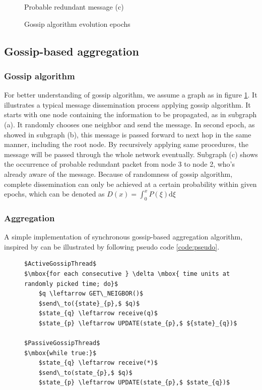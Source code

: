 \begin{figure}[h!]
\begin{center}
\begin{minipage}[c]{0.45\textwidth}
      Probable redundant message (c)
   	\end{minipage}
   \end{center}
   \caption{Gossip algorithm evolution epochs}
   \label{fig:epochs}
\end{figure}
\subsection{Gossip-based aggregation}

\subsubsection{Gossip algorithm}
For better understanding of gossip algorithm, we assume a graph as in figure \ref{fig:epochs}. It illustrates a typical message dissemination process applying gossip algorithm. It starts with one node containing the information to be propagated, as in subgraph (a). It randomly chooses one neighbor and send the message. In second epoch, as showed in subgraph (b), this message is passed forward to next hop in the same manner, including the root node. By recursively applying same procedures, the message will be passed through the whole network eventually. Subgraph (c) shows the occurrence of probable redundant packet from node 3 to node 2, who's already aware of the message. Because of randomness of gossip algorithm, complete dissemination can only be achieved at a certain probability within given epochs, which can be denoted as $D(x)=\int_0^x P(\xi)\mathrm{d}\xi$\\

\subsubsection{Aggregation}

A simple implementation of synchronous gossip-based aggregation algorithm, inspired by \cite{jelasity_gossip-based_2005} can be illustrated by following pseudo code \ref{code:pseudo}.
\begin{figure}[!h]
\begin{lstlisting}[caption={Pseudo Code for gossip-based aggregation}, label=code:pseudo, mathescape=true, captionpos=b]
$ActiveGossipThread$
$\mbox{for each consecutive } \delta \mbox{ time units at randomly picked time; do}$
    $q \leftarrow GET\_NEIGBOR()$
    $send\_to({state}_{p},$ $q)$
    $state_{q} \leftarrow receive(q)$
    $state_{p} \leftarrow UPDATE(state_{p},$ ${state}_{q})$

$PassiveGossipThread$
$\mbox{while true:}$
    $state_{q} \leftarrow receive(*)$
    $send\_to(state_{p},$ $q)$
    $state_{p} \leftarrow UPDATE(state_{p},$ $state_{q})$
\end{lstlisting}
\end{figure}

